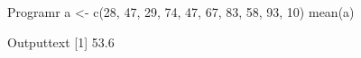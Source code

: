 
\begin{code}
    {Program}{r}
a <- c(28, 47, 29, 74, 47, 67, 83, 58, 93, 10)
mean(a)
\end{code}
\begin{code}
    {Output}{text}
[1] 53.6
\end{code}
